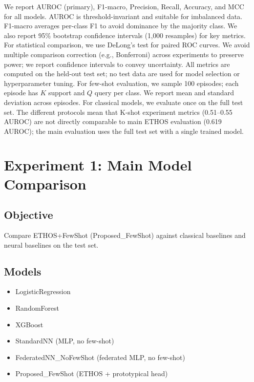 We report AUROC (primary), F1-macro, Precision, Recall, Accuracy, and MCC for all models. AUROC is threshold-invariant and suitable for imbalanced data. F1-macro averages per-class F1 to avoid dominance by the majority class. We also report 95\% bootstrap confidence intervals (1,000 resamples) for key metrics. For statistical comparison, we use DeLong's test for paired ROC curves. We avoid multiple comparison correction (e.g., Bonferroni) across experiments to preserve power; we report confidence intervals to convey uncertainty. All metrics are computed on the held-out test set; no test data are used for model selection or hyperparameter tuning. For few-shot evaluation, we sample 100 episodes; each episode has $K$ support and $Q$ query per class. We report mean and standard deviation across episodes. For classical models, we evaluate once on the full test set. The different protocols mean that K-shot experiment metrics (0.51--0.55 AUROC) are not directly comparable to main ETHOS evaluation (0.619 AUROC); the main evaluation uses the full test set with a single trained model.

\section{Experiment 1: Main Model Comparison}

\subsection{Objective}

Compare ETHOS+FewShot (Proposed\_FewShot) against classical baselines and neural baselines on the test set.

\subsection{Models}

\begin{itemize}
\item LogisticRegression
\item RandomForest
\item XGBoost
\item StandardNN (MLP, no few-shot)
\item FederatedNN\_NoFewShot (federated MLP, no few-shot)
\item Proposed\_FewShot (ETHOS + prototypical head)
\end{itemize}

